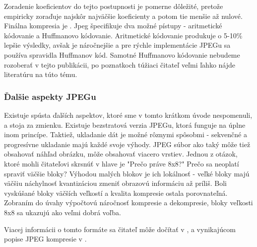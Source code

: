 Zoradenie koeficientov
do tejto postupnosti je pomerne dôležité, pretože empiricky zoraďuje
najskôr najväčšie koeficienty a potom tie menšie až nulové.
Finálna kompresia je . Jpeg špecifikuje dva možné
pístupy - aritmetické kódovanie a Huffmanovo kódovanie. Aritmetické
kódovanie produkuje o 5-10\% lepšie výsledky, avšak je náročnejšie a
pre rýchle implementácie JPEGu sa používa spravidla Huffmanov kód.
Samotné Huffmanovo kódovanie nebudeme rozoberať v tejto publikácii,
po poznatkoch túžiaci čitateľ veľmi ľahko nájde literatúru na túto
tému.

\subsubsection{Ďalšie aspekty JPEGu}

Existuje spústa ďalších aspektov, ktoré sme v tomto krátkom úvode
nespomenuli, a stoja za zmienku. Existuje bezstratová verzia JPEGu,
ktorá funguje na úplne inom princípe. Taktiež, ukladanie dát je možné
rôznymi spôsobmi - sekvenčné a progresívne ukladanie majú každé svoje
výhody. JPEG súbor ako taký môže tiež obsahovať náhľad obrázku, 
môže obsahovať viacero vrstiev.
Jednou z otázok, ktoré mohli čitateľovi skrsnúť v hlave je "Prečo
práve 8x8?" Prečo sa neoplatí spraviť väčšie bloky? Výhodou malých
blokov je ich lokálnosť - veľké bloky majú väčšiu náchylnosť
kvantizáciou zmeniť obrazovú informáciu až príliš. Boli vyskúšané
bloky väčších veľkostí a kvalita kompresie ostala porovnateľná.
Zobraním do úvahy výpočtovú náročnosť kompresie a dekompresie, bloky
veľkosti 8x8 sa ukazujú ako veľmi dobrá voľba.

Viacej informácii o tomto formáte sa čitateľ môže dočítať v
\cite{wiki:jfif}, \cite{wiki:jpeg} a vynikajúcom popise JPEG kompresie
v \cite{wallace1991}.
